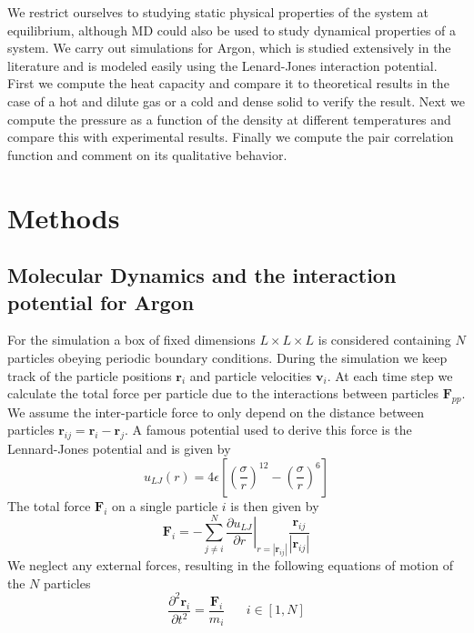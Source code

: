 \documentclass[twoside]{article}
\begin{document}
We restrict ourselves to studying static physical properties of the system at equilibrium, although MD could also be used to study dynamical properties of a system. We carry out simulations for Argon, which is studied extensively in the literature and is modeled easily using the Lenard-Jones interaction potential. First we compute the heat capacity and compare it to theoretical results in the case of a hot and dilute gas or a cold and dense solid to verify the result. Next we compute the pressure as a function of the density at different temperatures and compare this with experimental results. Finally we compute the pair correlation function and comment on its qualitative behavior.


\section{Methods}
\subsection{Molecular Dynamics and the interaction potential for Argon}
For the simulation a box of fixed dimensions $L\times L\times L$ is considered containing $N$ particles obeying periodic boundary conditions. During the simulation we keep track of the particle positions $\mathbf{r}_i$ and particle velocities $\mathbf{v}_i$. At each time step we calculate the total force per particle  due to the interactions between particles $\mathbf{F}_{pp}$. 
We assume the inter-particle force to only depend on the distance between particles $\mathbf{r}_{ij} = \mathbf{r}_i - \mathbf{r}_j$. A famous potential used to derive this force is the Lennard-Jones potential and is given by
\begin{equation}\label{eq_lj}
u_{LJ}(r) = 4\epsilon \left[\left(\frac{\sigma}{r}\right)^{12} - \left(\frac{\sigma}{r}\right)^6  \right]
\end{equation}
The total force  $\mathbf{F}_i$  on a single particle $i$ is then given by 
\begin{equation}\label{eq_force_sum}
\mathbf{F}_i = -\sum_{j\not=i}^N \left.\frac{\partial u_{LJ}}{\partial r}\right|_{r= |\mathbf{r}_{ij}|}  \frac{\mathbf{r}_{ij}}{|\mathbf{r}_{ij}|}
\end{equation}
We neglect any external forces, resulting in the following equations of motion of the $N$ particles
\begin{equation}\label{eq_motion}
\frac{\partial ^2\mathbf{r}_i}{\partial t^2} = \frac{\mathbf{F}_i}{m_i} \hspace{20pt} i\in [1, N]
\end{equation}
\end{document}
